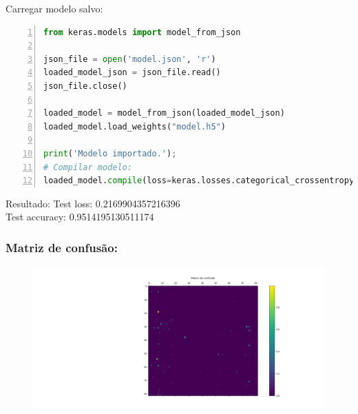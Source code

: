 \documentclass[hyperref={pdfpagelabels=false},table]{beamer}
\begin{document}
\begin{frame}[containsverbatim]
	\begin{exampleblock}{Carregar modelo salvo:}
		\begin{lstlisting}[language=python, showspaces=false, breaklines=true,
		keepspaces=true, numbers=left, numberfirstline=false]
from keras.models import model_from_json

json_file = open('model.json', 'r')
loaded_model_json = json_file.read()
json_file.close()

loaded_model = model_from_json(loaded_model_json)
loaded_model.load_weights("model.h5")

print('Modelo importado.');
# Compilar modelo:
loaded_model.compile(loss=keras.losses.categorical_crossentropy, optimizer=keras.optimizers.Adadelta(),metrics=['accuracy'])
		\end{lstlisting}
	\end{exampleblock}
	\begin{block}{Resultado:}
		Test loss: 0.2169904357216396 \\
		Test accuracy: 0.9514195130511174
	\end{block}
\end{frame}

\begin{frame}
	\frametitle{Matriz de confusão:}
	\begin{figure}
		\includegraphics[scale = 0.38, trim ={18.5cm 1.5cm 7.5cm
		2cm}]{Figuras/Confusao}
	\end{figure}
\end{frame}
\end{document}
